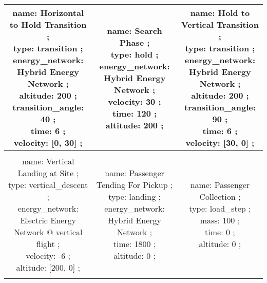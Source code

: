 \begin{table}[h]
\begin{adjustbox}{width=1\textwidth}
\begin{tabular}{|c|c|c|}
\makecell{name: Horizontal to Hold Transition ; \\ type: transition ; \\ energy\_network: Hybrid Energy Network ; \\ altitude: 200 ; \\ transition\_angle: 40 ; \\ time: 6 ; \\ velocity: [0, 30] ; \\ } & \makecell{name: Search Phase ; \\ type: hold ; \\ energy\_network: Hybrid Energy Network ; \\ velocity: 30 ; \\ time: 120 ; \\ altitude: 200 ; \\ } & \makecell{name: Hold to Vertical Transition ; \\ type: transition ; \\ energy\_network: Hybrid Energy Network ; \\ altitude: 200 ; \\ transition\_angle: 90 ; \\ time: 6 ; \\ velocity: [30, 0] ; \\ }\\ \hline \\ 
\makecell{name: Vertical Landing at Site ; \\ type: vertical\_descent ; \\ energy\_network: Electric Energy Network @ vertical flight ; \\ velocity: -6 ; \\ altitude: [200, 0] ; \\ } & \makecell{name: Passenger Tending For Pickup ; \\ type: landing ; \\ energy\_network: Hybrid Energy Network ; \\ time: 1800 ; \\ altitude: 0 ; \\ } & \makecell{name: Passenger Collection ; \\ type: load\_step ; \\ mass: 100 ; \\ time: 0 ; \\ altitude: 0 ; \\ }\\ \hline \\ 

\end{tabular}
\end{adjustbox}
\end{table}
